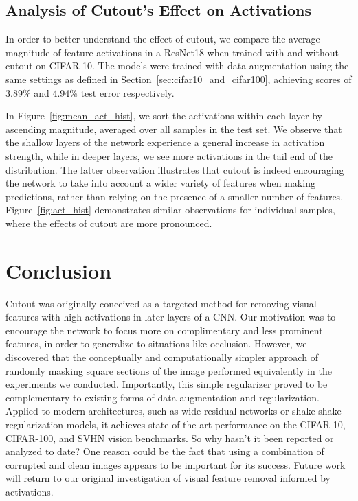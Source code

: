 \documentclass[10pt,twocolumn,letterpaper]{article}
\begin{document}
\subsection{Analysis of Cutout's Effect on Activations}
\label{analysis}

In order to better understand the effect of cutout, we compare the average magnitude of feature activations in a ResNet18 when trained with and without cutout on CIFAR-10. The models were trained with data augmentation using the same settings as defined in Section~\ref{sec:cifar10_and_cifar100}, achieving scores of 3.89\% and 4.94\% test error respectively.

In Figure~\ref{fig:mean_act_hist}, we sort the activations within each layer by ascending magnitude, averaged over all samples in the test set. We observe that the shallow layers of the network experience a general increase in activation strength, while in deeper layers, we see more activations in the tail end of the distribution. The latter observation illustrates that cutout is indeed encouraging the network to take into account a wider variety of features when making predictions, rather than relying on the presence of a smaller number of features. Figure~\ref{fig:act_hist} demonstrates similar observations for individual samples, where the effects of cutout are more pronounced.

\section{Conclusion}
Cutout was originally conceived as a targeted method for removing visual
features with high activations in later layers of a CNN\@. Our motivation was to
encourage the network to focus more on complimentary and less prominent features, in
order to generalize to situations like occlusion. However, we discovered that
the conceptually and computationally simpler approach of randomly masking square
sections of the image performed equivalently in the experiments we conducted.
Importantly, this simple regularizer proved to be complementary to
existing forms of data augmentation and regularization. Applied to modern
architectures, such as wide residual networks or shake-shake regularization models,
it achieves state-of-the-art performance on the CIFAR-10,
CIFAR-100, and SVHN vision benchmarks. So why hasn't it been reported or
analyzed to date?
One reason could be the fact that using a combination of corrupted and clean images appears to be important for its success.
Future work will return to
our original investigation of visual feature removal informed by activations.
\end{document}
